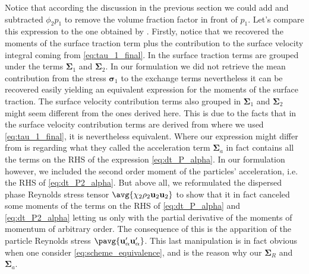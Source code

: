 Notice that according the discussion in the previous section we could add and subtracted $\phi_2 p_1$ to remove the volume fraction factor in front of $p_1$.
Let's compare this expression to the one obtained by \citet{zhang1997momentum}. 
Firstly, notice that we recovered the moments of the surface traction term plus the contribution to the surface velocity integral coming from \ref{eq:tau_1_final}. 
In \citet{zhang1997momentum} the surface traction terms are grouped under the terms $\bm{\Sigma}_1$ and $\bm{\Sigma}_2$.
In our formulation we did not retrieve the mean contribution from the stress $\bm{\sigma}_1$ to the exchange terms nevertheless it can be recovered easily yielding an equivalent expression for the moments of the surface traction. 
The surface velocity contribution terms also grouped in $\bm{\Sigma}_1$ and $\bm{\Sigma}_2$ might seem different from the ones derived here. 
This is due to the facts that in \citet{zhang1997momentum} the surface velocity contribution terms are derived from \citet{eq:tau_1} where we used \ref{eq:tau_1_final}, it is nevertheless equivalent. 
Where our expression might differ from \citet{zhang1997momentum} is regarding what they called the acceleration term $\bm{\Sigma}_a$ in fact contains all the terms on the RHS of the expression \ref{eq:dt_P_alpha}.
In our formulation however, we included the second order moment of the particles' acceleration, i.e. the RHS of \ref{eq:dt_P2_alpha}.
But above all, we reformulated the dispersed phase Reynolds stress tensor $\avg{\chi_2\rho_2 \textbf{u}_2 \textbf{u}_2}$ to show that it in fact canceled some moments of the terms on the RHS of \ref{eq:dt_P_alpha} and \ref{eq:dt_P2_alpha} letting us only with the partial derivative of the moments of momentum of arbitrary order.
The consequence of this is the apparition of the particle Reynolds stress $\pavg{\textbf{u}_\alpha'\textbf{u}_\alpha'}$. 
This last manipulation is in fact obvious when one consider \ref{eq:scheme_equivalence}, and is the reason why our $\bm{\Sigma}_R$ and $\bm{\Sigma}_a$.

